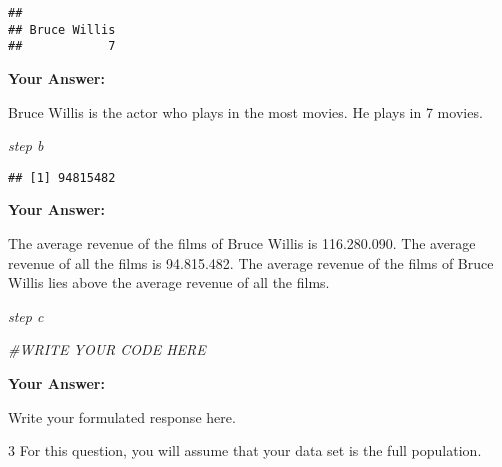 \documentclass[
]{article}
\newenvironment{Shaded}{\begin{snugshade}}{\end{snugshade}}
\newcommand{\AttributeTok}[1]{\textcolor[rgb]{0.13,0.29,0.53}{#1}}
\newcommand{\CommentTok}[1]{\textcolor[rgb]{0.56,0.35,0.01}{\textit{#1}}}
\newcommand{\FunctionTok}[1]{\textcolor[rgb]{0.13,0.29,0.53}{\textbf{#1}}}
\newcommand{\NormalTok}[1]{#1}
\newcommand{\OtherTok}[1]{\textcolor[rgb]{0.56,0.35,0.01}{#1}}
\newcommand{\SpecialCharTok}[1]{\textcolor[rgb]{0.81,0.36,0.00}{\textbf{#1}}}
\newcommand{\StringTok}[1]{\textcolor[rgb]{0.31,0.60,0.02}{#1}}
\begin{document}
\begin{verbatim}
## 
## Bruce Willis 
##            7
\end{verbatim}

\textbf{Your Answer:}

Bruce Willis is the actor who plays in the most movies. He plays in 7
movies.

\emph{step b}

\begin{Shaded}
\end{Shaded}

\begin{verbatim}
## [1] 94815482
\end{verbatim}

\textbf{Your Answer:}

The average revenue of the films of Bruce Willis is 116.280.090. The
average revenue of all the films is 94.815.482. The average revenue of
the films of Bruce Willis lies above the average revenue of all the
films.

\emph{step c}

\begin{Shaded}
\begin{Highlighting}[]
\CommentTok{\#WRITE YOUR CODE HERE}
\end{Highlighting}
\end{Shaded}

\textbf{Your Answer:}

Write your formulated response here.

3 For this question, you will assume that your data set is the full
population.
\end{document}
